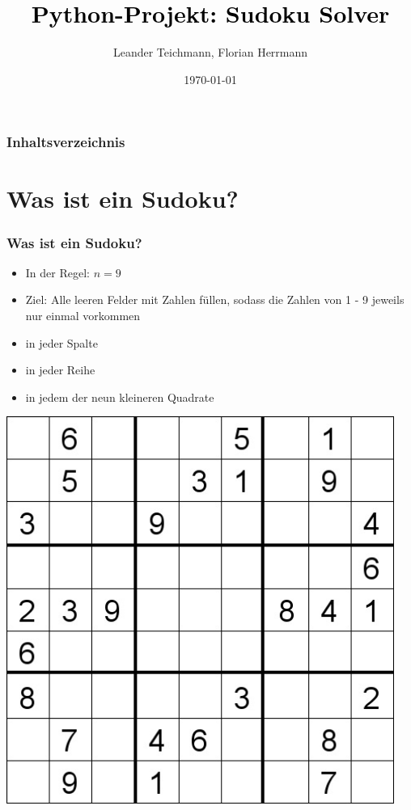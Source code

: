 \documentclass{beamer}
\begin{document}
\title{\textcolor{black}{Python-Projekt: Sudoku Solver}}   
\author{Leander Teichmann, Florian Herrmann} 
\date{\today}

\begin{frame}
\titlepage
\end{frame}


\begin{frame}
\frametitle{Inhaltsverzeichnis}\tableofcontents
\end{frame}

\section{Was ist ein Sudoku?}
\begin{frame}
	\frametitle{Was ist ein Sudoku?} 
	\begin{minipage}{0.48\textwidth}
	\begin{itemize}
		\item In der Regel: $n = 9$
		\item Ziel: Alle leeren Felder mit Zahlen füllen, sodass die Zahlen von 1 - 9 jeweils nur einmal vorkommen 
		\item in jeder Spalte 
		\item in jeder Reihe 
		\item in jedem der neun kleineren Quadrate
	\end{itemize} 
	\end{minipage}
	\begin{minipage}{0.48\textwidth}
		\centering
		\includegraphics[width=0.95\textwidth]{img/sudoku.jpg}
	\end{minipage}
\end{frame}
\end{document}
